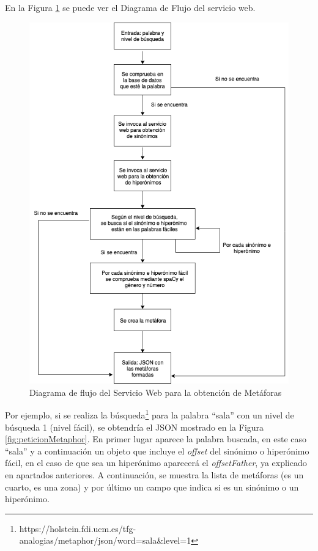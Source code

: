 En la Figura \ref{fig:swmetafora} se puede ver el Diagrama de Flujo del servicio web.
\begin{figure}[!h]
	\includegraphics[width=.9\textwidth]{Imagenes/Bitmap/Capitulo4/ServiciosWeb/DiagramaFlujoMetafora.png}
	\centering
	\caption{Diagrama de flujo del Servicio Web para la obtención de Metáforas}
	\label{fig:swmetafora}
\end{figure}

Por ejemplo, si se realiza la búsqueda\footnote{https://holstein.fdi.ucm.es/tfg-analogias/metaphor/json/word=sala\&level=1} para la palabra ``sala'' con un nivel de búsqueda 1 (nivel fácil), se obtendría el JSON mostrado en la Figura \ref{fig:peticionMetaphor}. En primer lugar aparece la palabra buscada, en este caso ``sala'' y a continuación un objeto que incluye el \textit{offset} del sinónimo o hiperónimo fácil, en el caso de que sea un hiperónimo aparecerá el \textit{offsetFather}, ya explicado en apartados anteriores. A continuación, se muestra la lista de metáforas (es un cuarto, es una zona) y por último un campo que indica si es un sinónimo o un hiperónimo. 



